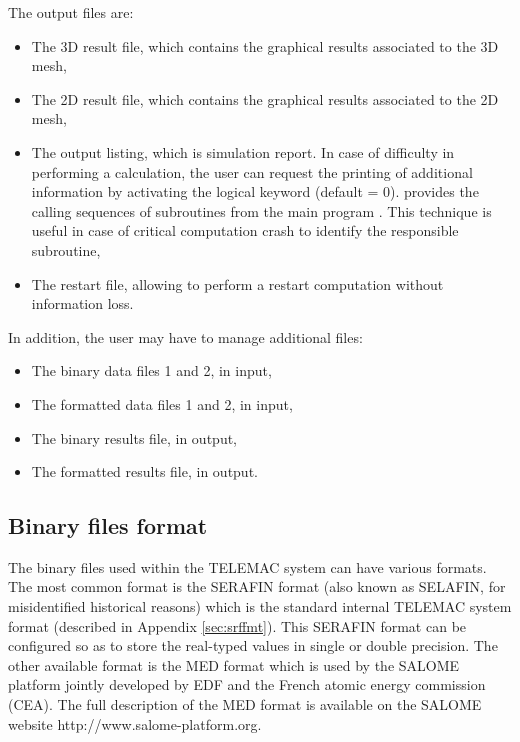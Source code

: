 The output files are:

\begin{itemize}
\item The 3D result file, which contains the graphical results associated to
the 3D mesh,

\item The 2D result file, which contains the graphical results associated to
the 2D mesh,

\item The output listing, which is simulation report. In case of difficulty in
performing a calculation, the user can request the printing of additional
information by activating the logical keyword  (default = 0).
 provides the calling sequences of subroutines from the
main program . This technique is useful in case of
critical computation crash to identify the responsible subroutine,

%
\item The restart file, allowing to perform a restart computation without
information loss.
\end{itemize}

In addition, the user may have to manage additional files:

\begin{itemize}
\item The binary data files 1 and 2, in input,

\item The formatted data files 1 and 2, in input,

\item The binary results file, in output,

\item The formatted results file, in output.
\end{itemize}


\subsection{Binary files format}
\label{sec:binfile}
The binary files used within the TELEMAC system can have various formats. The
most common format is the SERAFIN format (also known as SELAFIN, for
misidentified historical reasons) which is the standard internal TELEMAC system
format (described in Appendix \ref{sec:srffmt}). This SERAFIN format can be
configured so as to store the real-typed values in single or double precision.
The other available format is the MED format which is used by the SALOME
platform jointly developed by EDF and the French atomic energy commission
(CEA).
The full description of the MED format is available on the SALOME website
http://www.salome-platform.org.

